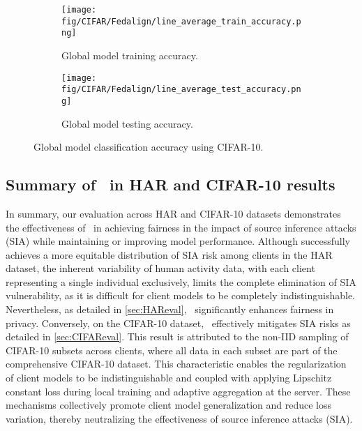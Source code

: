 \begin{figure}[!t]
  \centering
  \begin{subfigure}[b]{0.99\columnwidth}
    \centering
    \texttt{[image: fig/CIFAR/Fedalign/line\_average\_train\_accuracy.png]}
    \caption{Global model training accuracy. }
  \end{subfigure}
  \hfill
  \begin{subfigure}[b]{0.99\columnwidth}
    \centering
    \texttt{[image: fig/CIFAR/Fedalign/line\_average\_test\_accuracy.png]}
     \caption{Global model testing accuracy.}
  \end{subfigure}
  \caption{Global model classification accuracy using CIFAR-10.}
  \label{fig:accu cifar}
\end{figure}







\subsection{Summary of \sysname\ in HAR and CIFAR-10 results}
In summary, our evaluation across HAR and CIFAR-10 datasets demonstrates the effectiveness of \sysname\ in achieving fairness in the impact of source inference attacks (SIA) while maintaining or improving model performance.   Although \sysname successfully achieves a more equitable distribution of SIA risk among clients in the HAR dataset, the inherent variability of human activity data, with each client representing a single individual exclusively, limits the complete elimination of SIA vulnerability, as it is difficult for client models to be completely indistinguishable. Nevertheless, as detailed in \autoref{sec:HAReval}, \sysname\ significantly enhances fairness in privacy.  Conversely, on the CIFAR-10 dataset, \sysname\ effectively mitigates SIA risks as detailed in \autoref{sec:CIFAReval}. This result is attributed to the non-IID sampling of CIFAR-10 subsets across clients, where all data in each subset are part of the comprehensive CIFAR-10 dataset. This characteristic enables the regularization of client models to be indistinguishable and coupled with applying Lipschitz constant loss during local training and adaptive aggregation at the server. These mechanisms collectively promote client model generalization and reduce loss variation, thereby neutralizing the effectiveness of source inference attacks (SIA).











